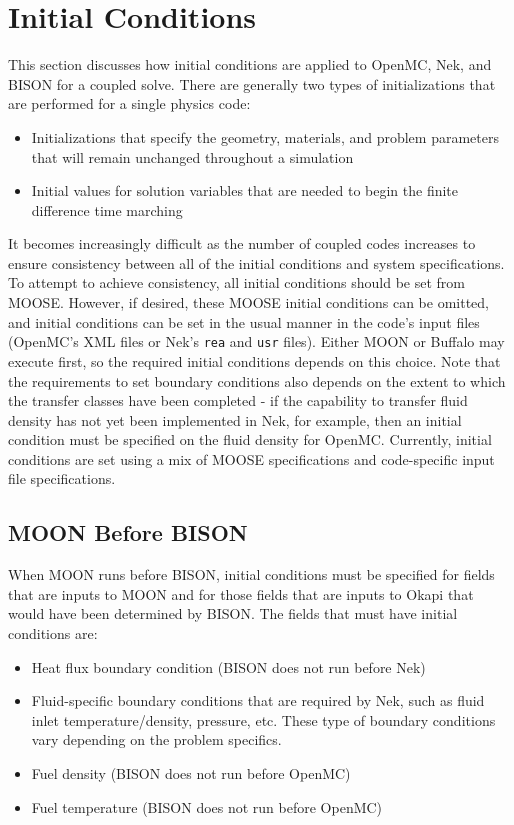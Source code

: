 \documentclass[10pt]{article}
\numberwithin{equation}{section} %
\begin{document}
\clearpage
\section{Initial Conditions}
\label{sec:ICs}
This section discusses how initial conditions are applied to OpenMC, Nek, and BISON for a coupled solve. There are generally two types of initializations that are performed for a single physics code:

\begin{itemize}
\item Initializations that specify the geometry, materials, and problem parameters that will remain unchanged throughout a simulation
\item Initial values for solution variables that are needed to begin the finite difference time marching
\end{itemize}

It becomes increasingly difficult as the number of coupled codes increases to ensure consistency between all of the initial conditions and system specifications. To attempt to achieve consistency, all initial conditions should be set from MOOSE. However, if desired, these MOOSE initial conditions can be omitted, and initial conditions can be set in the usual manner in the code's input files (OpenMC's XML files or Nek's {\tt rea} and {\tt usr} files). Either MOON or Buffalo may execute first, so the required initial conditions depends on this choice. Note that the requirements to set boundary conditions also depends on the extent to which the transfer classes have been completed - if the capability to transfer fluid density has not yet been implemented in Nek, for example, then an initial condition must be specified on the fluid density for OpenMC. Currently, initial conditions are set using a mix of MOOSE specifications and code-specific input file specifications.

\subsection{MOON Before BISON}
When MOON runs before BISON, initial conditions must be specified for fields that are inputs to MOON and for those fields that are inputs to Okapi that would have been determined by BISON. The fields that must have initial conditions are:

\begin{itemize}
\item Heat flux boundary condition (BISON does not run before Nek)
\item Fluid-specific boundary conditions that are required by Nek, such as fluid inlet temperature/density, pressure, etc. These type of boundary conditions vary depending on the problem specifics.
\item Fuel density (BISON does not run before OpenMC)
\item Fuel temperature (BISON does not run before OpenMC)
\end{itemize}
\end{document}
